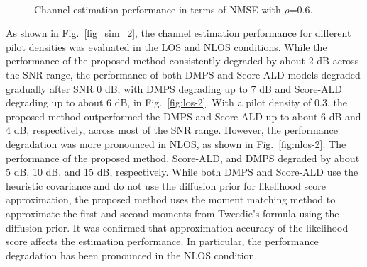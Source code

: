 \documentclass[lettersize,journal]{IEEEtran}
\begin{document}
\begin{figure}[!t]
\\
\caption{Channel estimation performance in terms of NMSE with $\rho$=0.6.}
\label{fig_sim_1}
\end{figure}

As shown in Fig.~\ref{fig_sim_2}, the channel estimation performance for different pilot densities was evaluated in the LOS and NLOS conditions. While the performance of the proposed method consistently degraded by about 2 dB across the SNR range, the performance of both DMPS and Score-ALD models degraded gradually after SNR 0 dB, with DMPS degrading up to 7 dB and Score-ALD degrading up to about 6 dB, in Fig.~\ref{fig:los-2}. With a pilot density of 0.3, the proposed method outperformed the DMPS and Score-ALD up to about 6 dB and 4 dB, respectively, across most of the SNR range. However, the performance degradation was more pronounced in NLOS, as shown in Fig.~\ref{fig:nlos-2}. The performance of the proposed method, Score-ALD, and DMPS degraded by about 5 dB, 10 dB, and 15 dB, respectively. While both DMPS and Score-ALD use the heuristic covariance and do not use the diffusion prior for likelihood score approximation, the proposed method uses the moment matching method to approximate the first and second moments from Tweedie's formula using the diffusion prior. It was confirmed that approximation accuracy of the likelihood score affects the estimation performance. In particular, the performance degradation has been pronounced in the NLOS condition.
\end{document}
